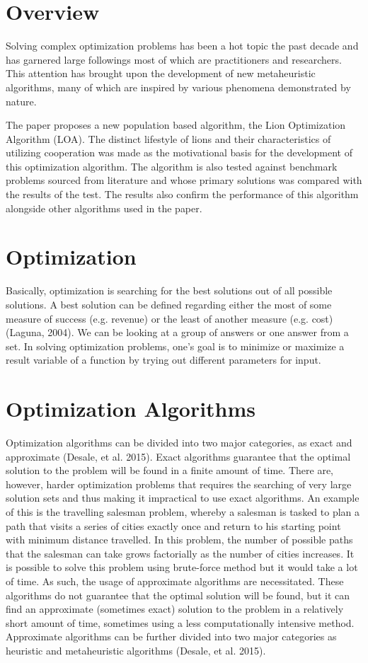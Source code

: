 \section{Overview}
Solving complex optimization problems has been a hot topic the past decade and has garnered large followings most of which are practitioners and researchers. This attention has brought upon the development of new metaheuristic algorithms, many of which are inspired by various phenomena demonstrated by nature.

The paper proposes a new population based algorithm, the Lion Optimization Algorithm (LOA). The distinct lifestyle of lions and their characteristics of utilizing cooperation was made as the motivational basis for the development of this optimization algorithm. The algorithm is also tested against benchmark problems sourced from literature and whose primary solutions was compared with the results of the test. The results also confirm the performance of this algorithm alongside other algorithms used in the paper.

\section{Optimization}
Basically, optimization is searching for the best solutions out of all possible solutions. A best solution can be defined regarding either the most of some measure of success (e.g. revenue) or the least of another measure (e.g. cost) (Laguna, 2004). We can be looking at a group of answers or one answer from a set. In solving optimization problems, one's goal is to minimize or maximize a result variable of a function by trying out different parameters for input.

\section{Optimization Algorithms}
Optimization algorithms can be divided into two major categories, as exact and approximate (Desale, et al. 2015). Exact algorithms guarantee that the optimal solution to the problem will be found in a finite amount of time. There are, however, harder optimization problems that requires the searching of very large solution sets and thus making it impractical to use exact algorithms. An example of this is the travelling salesman problem, whereby a salesman is tasked to plan a path that visits a series of cities exactly once and return to his starting point with minimum distance travelled. In this problem, the number of possible paths that the salesman can take grows factorially as the number of cities increases. It is possible to solve this problem using brute-force method but it would take a lot of time. As such, the usage of approximate algorithms are necessitated. These algorithms do not guarantee that the optimal solution will be found, but it can find an approximate (sometimes exact) solution to the problem in a relatively short amount of time, sometimes using a less computationally intensive method. Approximate algorithms can be further divided into two major categories as heuristic and metaheuristic algorithms (Desale, et al. 2015).

